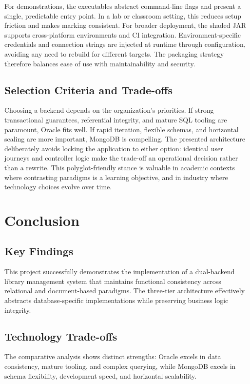 \documentclass[12pt,a4paper]{article}
\begin{document}
For demonstrations, the executables abstract command-line flags and present a single, predictable entry point. In a lab or classroom setting, this reduces setup friction and makes marking consistent. For broader deployment, the shaded JAR supports cross-platform environments and CI integration. Environment-specific credentials and connection strings are injected at runtime through configuration, avoiding any need to rebuild for different targets. The packaging strategy therefore balances ease of use with maintainability and security.

\subsection{Selection Criteria and Trade-offs}

Choosing a backend depends on the organization’s priorities. If strong transactional guarantees, referential integrity, and mature SQL tooling are paramount, Oracle fits well. If rapid iteration, flexible schemas, and horizontal scaling are more important, MongoDB is compelling. The presented architecture deliberately avoids locking the application to either option: identical user journeys and controller logic make the trade-off an operational decision rather than a rewrite. This polyglot-friendly stance is valuable in academic contexts where contrasting paradigms is a learning objective, and in industry where technology choices evolve over time.

\section{Conclusion}

\subsection{Key Findings}

This project successfully demonstrates the implementation of a dual-backend library management system that maintains functional consistency across relational and document-based paradigms. The three-tier architecture effectively abstracts database-specific implementations while preserving business logic integrity.

\subsection{Technology Trade-offs}

The comparative analysis shows distinct strengths: Oracle excels in data consistency, mature tooling, and complex querying, while MongoDB excels in schema flexibility, development speed, and horizontal scalability.
\end{document}
